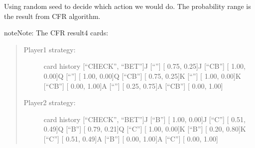 \documentclass[letterpaper,10pt,english]{sphinxmanual}
\begin{document}
\begin{fulllineitems}
\begin{fulllineitems}
\end{fulllineitems}


\begin{fulllineitems}
\label{\detokenize{strategy:strategy.agent_strategy.PokerStrategy.card4strategy}}
\pysigstartsignatures
{}
\pysigstopsignatures
\sphinxAtStartPar
Using random seed to decide which action we would do. The probability range is the result from CFR algorithm.

\begin{sphinxadmonition}{note}{Note:}
\sphinxAtStartPar
The CFR result4 cards:
\begin{quote}
\begin{description}
\item[{Player1 strategy:}] \leavevmode
\sphinxAtStartPar
card    history    {[}“CHECK”, “BET”{]}J       {[}“”{]}       {[}   0.75,  0.25{]}J       {[}“CB”{]}     {[}   1.00,  0.00{]}Q       {[}“”{]}       {[}   1.00,  0.00{]}Q       {[}“CB”{]}     {[}   0.75,  0.25{]}K       {[}“”{]}       {[}   1.00,  0.00{]}K       {[}“CB”{]}     {[}   0.00,  1.00{]}A       {[}“”{]}       {[}   0.25,  0.75{]}A       {[}“CB”{]}     {[}   0.00,  1.00{]}

\item[{Player2 strategy:}] \leavevmode
\sphinxAtStartPar
card    history    {[}“CHECK”, “BET”{]}J       {[}“B”{]}      {[}   1.00,  0.00{]}J       {[}“C”{]}      {[}   0.51,  0.49{]}Q       {[}“B”{]}      {[}   0.79,  0.21{]}Q       {[}“C”{]}      {[}   1.00,  0.00{]}K       {[}“B”{]}      {[}   0.20,  0.80{]}K       {[}“C”{]}      {[}   0.51,  0.49{]}A       {[}“B”{]}      {[}   0.00,  1.00{]}A       {[}“C”{]}      {[}   0.00,  1.00{]}

\end{description}
\end{quote}
\end{sphinxadmonition}

\end{fulllineitems}


\begin{fulllineitems}
\label{\detokenize{strategy:strategy.agent_strategy.PokerStrategy.get_strategy}}
\pysigstartsignatures
{}
\pysigstopsignatures
\end{fulllineitems}


\end{fulllineitems}
\end{document}
